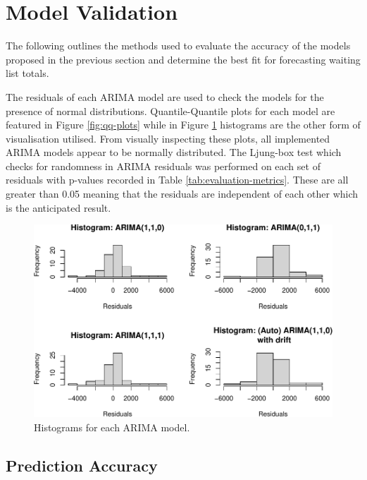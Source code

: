 \documentclass[
  12pt,
]{article}
\begin{document}
\hypertarget{model-validation}{%
\section{Model Validation}\label{model-validation}}

\label{sec:validation}
The following outlines the methods used to evaluate the accuracy of the models proposed in the previous section and determine the best fit for forecasting waiting list totals.

The residuals of each ARIMA model are used to check the models for the presence of normal distributions. Quantile-Quantile plots for each model are featured in Figure \ref{fig:qq-plots} while in Figure \ref{fig:histograms} histograms are the other form of visualisation utilised. From visually inspecting these plots, all implemented ARIMA models appear to be normally distributed. The Ljung-box test which checks for randomness in ARIMA residuals was performed on each set of residuals with p-values recorded in Table \ref{tab:evaluation-metrics}. These are all greater than 0.05 meaning that the residuals are independent of each other which is the anticipated result.

\begin{figure}

{\centering \includegraphics[width=0.8\linewidth]{data_science_ca4_files/figure-latex/histograms-1} 

}

\caption{Histograms for each ARIMA model.}\label{fig:histograms}
\end{figure}

\hypertarget{prediction-accuracy}{%
\subsection{Prediction Accuracy}\label{prediction-accuracy}}
\end{document}
